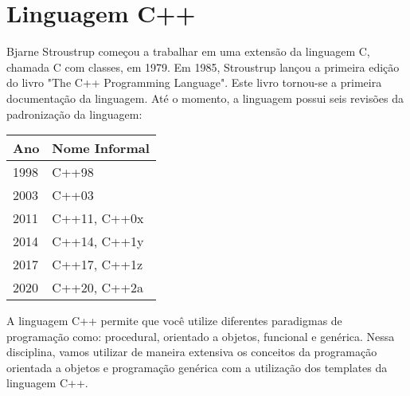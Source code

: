 \chapter{Linguagem C++}

Bjarne Stroustrup começou a trabalhar em uma extensão da linguagem C, chamada C com classes, em 1979. Em 1985, Stroustrup lançou a primeira edição do livro "The C++ Programming Language". Este livro tornou-se a primeira documentação da linguagem. Até o momento, a linguagem possui seis revisões da padronização da linguagem:

\begin{center}
\begin{tabular}{ll}
Ano & Nome Informal\\
\hline
1998	&	C++98\\
2003	&	C++03\\
2011	&	C++11, C++0x\\
2014	&	C++14, C++1y\\
2017	&	C++17, C++1z\\
2020	&	C++20, C++2a\\
\end{tabular}
\end{center}

A linguagem C++ permite que você utilize diferentes paradigmas de programação como: procedural, orientado a objetos, funcional e genérica. Nessa disciplina, vamos utilizar de maneira extensiva os conceitos da programação orientada a objetos e programação genérica com a utilização dos templates da linguagem C++.












